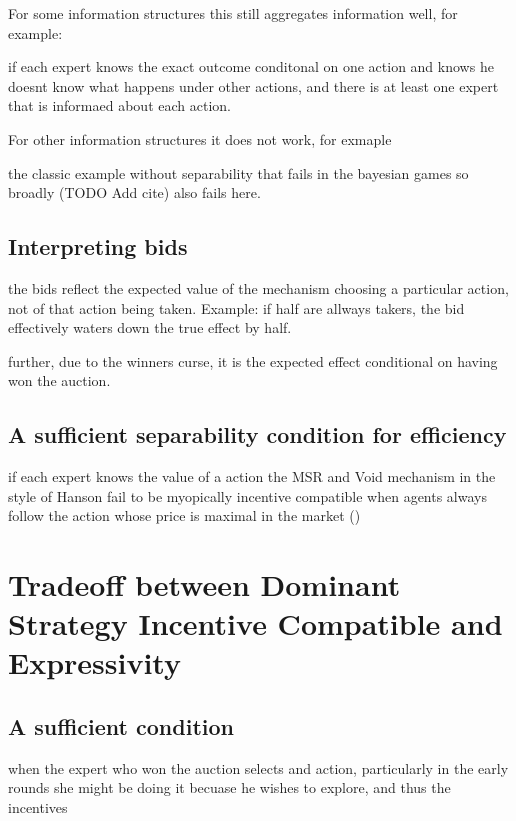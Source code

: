 For some information structures this still aggregates information well, for example:

\begin{lem}
	if each expert knows the exact outcome conditonal on one action and knows he doesnt know what happens under other actions, and there is at least one expert that is informaed about each action.
\end{lem}

For other information structures it does not work, for exmaple 
\begin{eg}
	the classic example without separability that fails in the bayesian games so broadly (TODO Add cite) also fails here. 
\end{eg}


\subsection{Interpreting bids}

the bids reflect the expected value of the mechanism choosing a particular action, not of that action being taken.  Example: if half are allways takers, the bid effectively waters down the true effect by half.

further, due to the winners curse, it is the expected effect conditional on having won the auction. 


\subsection{A sufficient separability condition for efficiency}

if each expert knows the value of a action the MSR and Void mechanism in the style of Hanson fail to be myopically incentive compatible when agents always follow the action whose price is maximal in the market (\cite{othman2010decision})



\section{Tradeoff between Dominant Strategy Incentive Compatible and Expressivity}



\subsection{A sufficient condition}

when the expert who won the auction selects and action, particularly in the early rounds she might be doing it becuase he wishes to explore, and thus the incentives 

